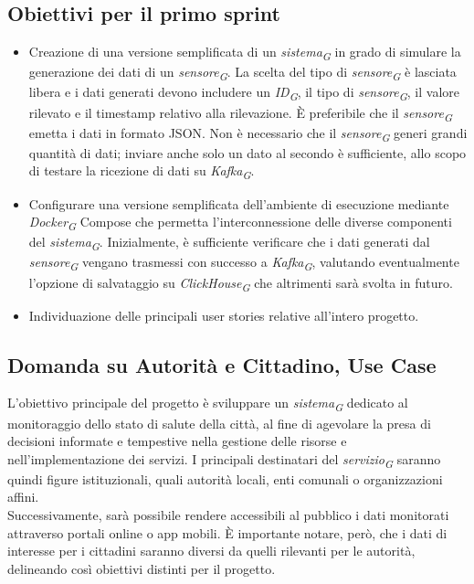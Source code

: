 \documentclass{article}
\begin{document}
    \subsection{Obiettivi per il primo sprint}
        \begin{itemize}
            \item Creazione di una versione semplificata di un \textit{sistema}\textsubscript{\textit{G}} in grado di simulare la generazione dei dati di un \textit{sensore}\textsubscript{\textit{G}}. La scelta del tipo di \textit{sensore}\textsubscript{\textit{G}} è lasciata libera e i dati generati devono includere un \textit{ID}\textsubscript{\textit{G}}, il tipo di \textit{sensore}\textsubscript{\textit{G}}, il valore rilevato e il timestamp relativo alla rilevazione. È preferibile che il \textit{sensore}\textsubscript{\textit{G}} emetta i dati in formato JSON. Non è necessario che il \textit{sensore}\textsubscript{\textit{G}} generi grandi quantità di dati; inviare anche solo un dato al secondo è sufficiente, allo scopo di testare la ricezione di dati su \textit{Kafka}\textsubscript{\textit{G}}.  
            \item Configurare una versione semplificata dell'ambiente di esecuzione mediante \textit{Docker}\textsubscript{\textit{G}} Compose che permetta l'interconnessione delle diverse componenti del \textit{sistema}\textsubscript{\textit{G}}. Inizialmente, è sufficiente verificare che i dati generati dal \textit{sensore}\textsubscript{\textit{G}} vengano trasmessi con successo a \textit{Kafka}\textsubscript{\textit{G}}, valutando eventualmente l'opzione di salvataggio su \textit{ClickHouse}\textsubscript{\textit{G}} che altrimenti sarà svolta in futuro.
            \item Individuazione delle principali user stories relative all’intero progetto.  
        \end{itemize}

    \subsection{Domanda su Autorità e Cittadino, Use Case}
        L'obiettivo principale del progetto è sviluppare un \textit{sistema}\textsubscript{\textit{G}} dedicato al monitoraggio dello stato di salute della città, al fine di agevolare la presa di decisioni informate e tempestive nella gestione delle risorse e nell'implementazione dei servizi. I principali destinatari del \textit{servizio}\textsubscript{\textit{G}} saranno quindi figure istituzionali, quali autorità locali, enti comunali o organizzazioni affini.\\
        Successivamente, sarà possibile rendere accessibili al pubblico i dati monitorati attraverso portali online o app mobili. È importante notare, però, che i dati di interesse per i cittadini saranno diversi da quelli rilevanti per le autorità, delineando così obiettivi distinti per il progetto.  
    
\end{document}
